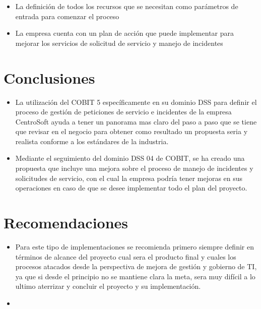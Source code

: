 \documentclass[conference]{IEEEtran}
\begin{document}
        \begin{itemize}
        \item La definición de todos los recursos que se necesitan como parámetros de entrada para comenzar el proceso
        \item La empresa cuenta con un plan de acción que puede implementar para mejorar los servicios de solicitud de servicio y manejo de incidentes 

        \end{itemize}

\section{Conclusiones}
        \hbox{}
        \begin{itemize}
        \item La utilización del COBIT 5 específicamente en su dominio DSS para definir el proceso de gestión de peticiones de servicio e incidentes de la empresa CentroSoft ayuda a tener un panorama mas claro del paso a paso que se tiene que revisar en el negocio para obtener como resultado un propuesta seria y realista conforme a los estándares de la industria.
        \item Mediante el seguimiento del dominio DSS 04 de COBIT, se ha creado una propuesta que incluye una mejora sobre el proceso de manejo de incidentes y solicitudes de servicio, con el cual la empresa podría tener mejoras en sus operaciones en caso de que se desee implementar todo el plan del proyecto.
        \end{itemize}
        \hbox{}
\section{Recomendaciones}

        \begin{itemize}
        \hbox{}
        \item Para este tipo de implementaciones se recomienda primero siempre definir en términos de alcance del proyecto cual sera el producto final y cuales los procesos atacados desde la perspectiva de mejora de gestión y gobierno de TI, ya que si desde el principio no se mantiene clara la meta, sera muy difícil a lo ultimo aterrizar y concluir el proyecto y su implementación.
        \item 
        \end{itemize}
        \hbox{} 
\end{document}
